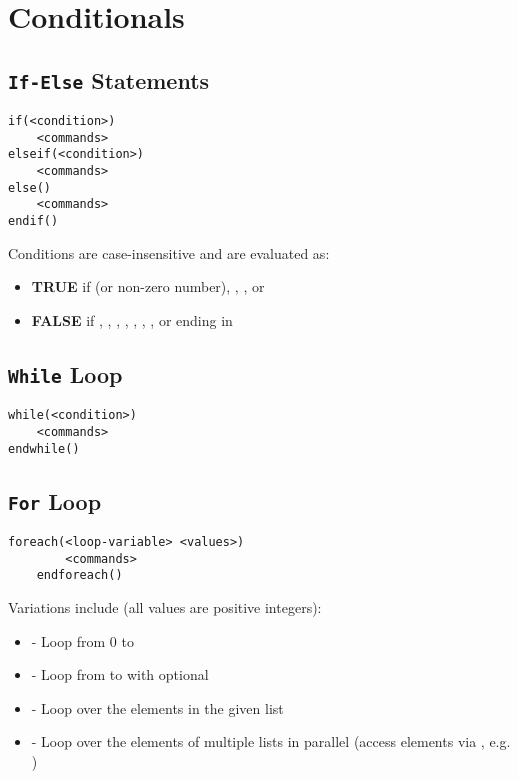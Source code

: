\section{Conditionals} \label{s:conditionals}



\subsection{\texttt{If-Else} Statements}
\begin{lstlisting}[style=CmakeStyle]
if(<condition>)
    <commands>
elseif(<condition>)
    <commands>
else()
    <commands>
endif()
\end{lstlisting}

Conditions are case-insensitive and are evaluated as:
\begin{itemize}
    \item \textbf{TRUE} if  (or non-zero number), , ,  or 
    \item \textbf{FALSE} if , , , , , , ,  or ending in 
\end{itemize}



\subsection{\texttt{While} Loop}
\begin{lstlisting}[style=CmakeStyle]
while(<condition>)
    <commands>
endwhile()
\end{lstlisting}



\subsection{\texttt{For} Loop} \label{ss:conditionals/for_loop}
\begin{lstlisting}[style=CmakeStyle]
    foreach(<loop-variable> <values>)
        <commands>
    endforeach()
\end{lstlisting}

Variations include (all values are positive integers):
\begin{itemize}
    \item {} - Loop from 0 to 
    \item {} - Loop from  to  with optional 
    \item {} - Loop over the elements in the given list
    \item {} - Loop over the elements of multiple lists in parallel (access elements via , e.g. )
\end{itemize}


